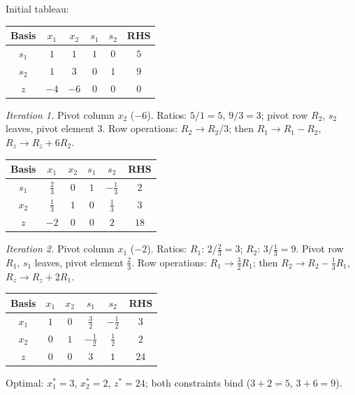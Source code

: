 \begin{solutions}
  \item Initial tableau:
        \begin{center}
        \begin{tabular}{c|cccc|c}
        Basis & $x_1$ & $x_2$ & $s_1$ & $s_2$ & RHS\\
        \hline
        $s_1$ & $1$ & $1$ & $1$ & $0$ & $5$\\
        $s_2$ & $1$ & $3$ & $0$ & $1$ & $9$\\
        \hline
        $z$ & $-4$ & $-6$ & $0$ & $0$ & $0$\\
        \end{tabular}
        \end{center}
        \emph{Iteration 1.} Pivot column $x_2$ ($-6$). Ratios: $5/1=5$,
        $9/3=3$; pivot row $R_2$, $s_2$ leaves, pivot element $3$. Row
        operations: $R_2\to R_2/3$; then $R_1\to R_1-R_2$,
        $R_z\to R_z+6R_2$.
        \begin{center}
        \begin{tabular}{c|cccc|c}
        Basis & $x_1$ & $x_2$ & $s_1$ & $s_2$ & RHS\\
        \hline
        $s_1$ & $\tfrac{2}{3}$ & $0$ & $1$ & $-\tfrac{1}{3}$ & $2$\\
        $x_2$ & $\tfrac{1}{3}$ & $1$ & $0$ & $\tfrac{1}{3}$ & $3$\\
        \hline
        $z$ & $-2$ & $0$ & $0$ & $2$ & $18$\\
        \end{tabular}
        \end{center}
        \emph{Iteration 2.} Pivot column $x_1$ ($-2$). Ratios: $R_1$:
        $2\big/\tfrac{2}{3}=3$; $R_2$: $3\big/\tfrac{1}{3}=9$. Pivot row
        $R_1$, $s_1$ leaves, pivot element $\tfrac{2}{3}$. Row
        operations: $R_1\to \tfrac{3}{2}R_1$; then
        $R_2\to R_2-\tfrac{1}{3}R_1$, $R_z\to R_z+2R_1$.
        \begin{center}
        \begin{tabular}{c|cccc|c}
        Basis & $x_1$ & $x_2$ & $s_1$ & $s_2$ & RHS\\
        \hline
        $x_1$ & $1$ & $0$ & $\tfrac{3}{2}$ & $-\tfrac{1}{2}$ & $3$\\
        $x_2$ & $0$ & $1$ & $-\tfrac{1}{2}$ & $\tfrac{1}{2}$ & $2$\\
        \hline
        $z$ & $0$ & $0$ & $3$ & $1$ & $24$\\
        \end{tabular}
        \end{center}
        Optimal: $x_1^{*}=3$, $x_2^{*}=2$, $z^{*}=24$; both constraints
        bind ($3+2=5$, $3+6=9$).


\end{solutions}
